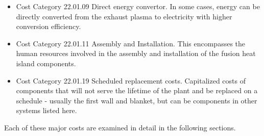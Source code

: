 \begin{itemize}
    \item Cost Category 22.01.09 Direct energy convertor. In some cases, energy can be directly converted from the exhaust plasma to electricity with higher conversion efficiency.
    
    \item Cost Category 22.01.11 Assembly and Installation. This encompasses the human resources involved in the assembly and installation of the fusion heat island components.

    \item Cost Category 22.01.19 Scheduled replacement costs.  Capitalized costs of components that will not serve the lifetime of the plant and be replaced on a schedule - usually the first wall and blanket, but can be components in other systems listed here.
 \end{itemize}


Each of these major costs are examined in detail in the following sections.